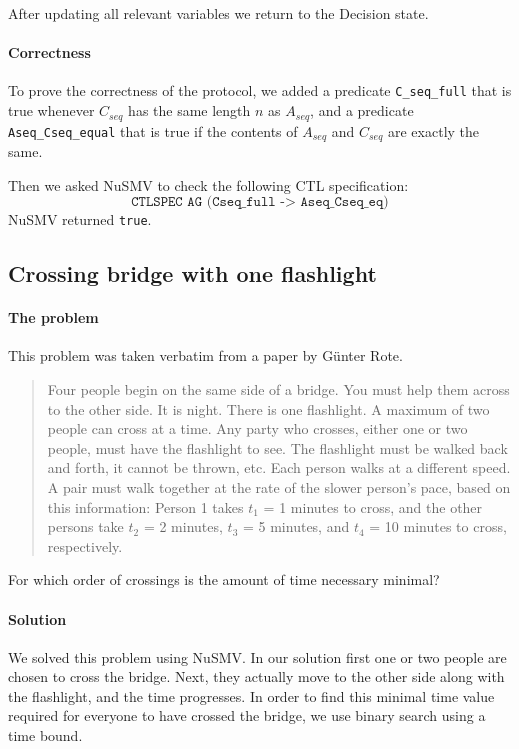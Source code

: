 \documentclass[12pt]{article}
\begin{document}
After updating all relevant variables we return to the Decision state.

\paragraph{Correctness} To prove the correctness of the protocol, 
we added a predicate \texttt{C\_seq\_full} that is true 
whenever $C_{seq}$ has the same length $n$ as $A_{seq}$, 
and a predicate \texttt{Aseq\_Cseq\_equal} that is true 
if the contents of $A_{seq}$ and $C_{seq}$ are exactly the same.

Then we asked NuSMV to check the following CTL specification:
\[ \texttt{CTLSPEC AG (Cseq\_full -> Aseq\_Cseq\_eq)} \]
NuSMV returned \texttt{true}.

\subsection*{Crossing bridge with one flashlight}
\paragraph{The problem}

This problem was taken verbatim from a paper by G\"unter Rote. \cite{rote2002crossing}

\begin{quotation}
Four people begin on the same side of a bridge.
You must help them across to the other side.
It is night.
There is one flashlight.
A maximum of two people can cross at a time.
Any party who crosses, either one or two people, must have the flashlight to see.
The flashlight must be walked back and forth, it cannot be thrown, etc.
Each person walks at a different speed.
A pair must walk together at the rate of the slower person's pace, based on this information:
Person 1 takes $t_1$ = 1 minutes to cross, and the other persons take $t_2$ = 2
minutes, $t_3$ = 5 minutes, and $t_4$ = 10 minutes to cross, respectively.
\end{quotation}

For which order of crossings is the amount of time necessary minimal?

\paragraph{Solution}
We solved this problem using NuSMV.
In our solution first one or two people are chosen to cross the bridge.
Next, they actually move to the other side along with the flashlight, and the time progresses.
In order to find this minimal time value required for everyone to have crossed the bridge, we use binary search using a time bound.
\end{document}
